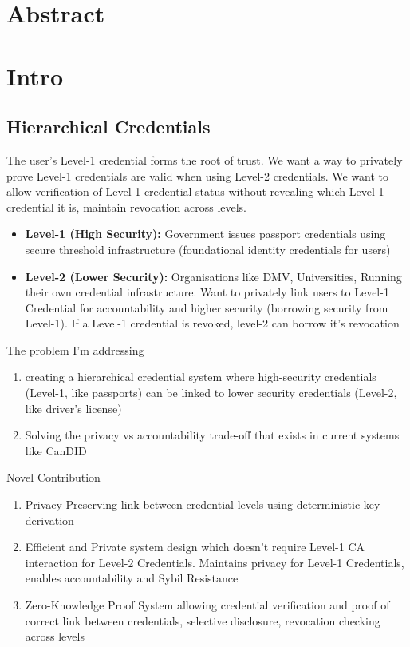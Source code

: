 \section{Abstract}



\section{Intro}

\subsection{Hierarchical Credentials}
The user's Level-1 credential forms the root of trust.
We want a way to privately prove Level-1 credentials are valid when using Level-2 credentials. We want to allow verification of Level-1 credential status without revealing which Level-1 credential it is, maintain revocation across levels.
\begin{itemize}
    \item \textbf{Level-1 (High Security):} Government issues passport credentials using secure threshold infrastructure (foundational identity credentials for users)
    \item \textbf{Level-2 (Lower Security):} Organisations like DMV, Universities, Running their own credential infrastructure. Want to privately link users to Level-1 Credential for accountability and higher security (borrowing security from Level-1). If a Level-1 credential is revoked, level-2 can borrow it's revocation
\end{itemize}

The problem I'm addressing
\begin{enumerate}
    \item creating a hierarchical credential system where high-security credentials (Level-1, like passports) can be linked to lower security credentials (Level-2, like driver's license)
    \item Solving the privacy vs accountability trade-off that exists in current systems like CanDID
\end{enumerate}

Novel Contribution
\begin{enumerate}
    \item Privacy-Preserving link between credential levels using deterministic key derivation
    \item Efficient and Private system design which doesn't require Level-1 CA interaction for Level-2 Credentials. Maintains privacy for Level-1 Credentials, enables accountability and Sybil Resistance
    \item Zero-Knowledge Proof System allowing credential verification and proof of correct link between credentials, selective disclosure, revocation checking across levels
\end{enumerate}


